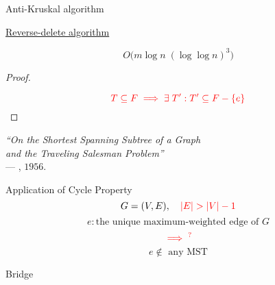 \begin{frame}{}
  \begin{exampleblock}{Anti-Kruskal algorithm }
	\begin{center}
	  {\href{https://en.wikipedia.org/wiki/Reverse-delete\_algorithm}{Reverse-delete algorithm }} \\[3pt]
	\end{center}
  \end{exampleblock}

  \pause
  \[
    O\Big(m \log n\; (\log \log n)^3\Big)
  \]

  \pause
  \begin{proof}
    \centerline{}
    \pause
    \[
      \textcolor{red}{T \subseteq F \implies \exists\; T': T' \subseteq F - \{e\}}
    \]
  \end{proof}

  \pause
  \vspace{0.20cm}
  \begin{center}
    {\it ``On the Shortest Spanning Subtree of a Graph \\
    and the Traveling Salesman Problem''} \\
    \hfill --- , $1956$.
  \end{center}
\end{frame}

\begin{frame}{}
  \begin{exampleblock}{Application of Cycle Property }
    \[
      G = (V, E), \quad \textcolor{red}{|E| > |V| - 1}
    \]
    \[
      e: \text{the unique maximum-weighted edge of } G
    \]
    \[
      \textcolor{red}{\implies^{?}} 
    \]
    \[
      e \notin \text{ any MST}
    \]
  \end{exampleblock}

  \pause
  \vspace{0.60cm}
  \centerline{\large Bridge}
\end{frame}

